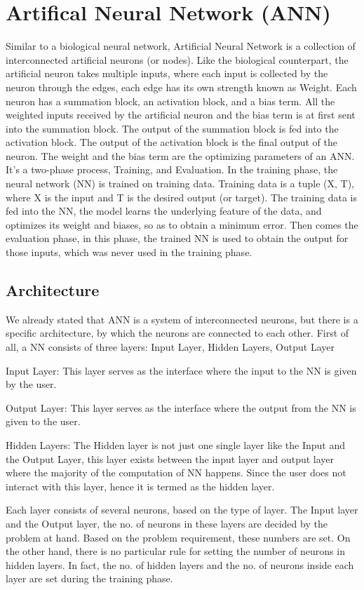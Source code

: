 \section{Artifical Neural Network (ANN)}
Similar to a biological neural network, Artificial Neural Network is a collection of interconnected artificial neurons (or nodes). Like the biological counterpart, the artificial neuron takes multiple inputs, where each input is collected by the neuron through the edges, each edge has its own strength known as Weight. Each neuron has a summation block, an activation block, and a bias term. All the weighted inputs received by the artificial neuron and the bias term is at first sent into the summation block. The output of the summation block is fed into the activation block. The output of the activation block is the final output of the neuron. The weight and the bias term are the optimizing parameters of an ANN. It's a two-phase process, Training, and Evaluation. In the training phase, the neural network (NN) is trained on training data. Training data is a tuple (X, T), where X is the input and T is the desired output (or target). The training data is fed into the NN, the model learns the underlying feature of the data, and optimizes its weight and biases, so as to obtain a minimum error. Then comes the evaluation phase, in this phase, the trained NN is used to obtain the output for those inputs, which was never used in the training phase.
\subsection{Architecture}
We already stated that ANN is a system of interconnected neurons, but there is a specific architecture, by which the neurons are connected to each other. First of all, a NN consists of three layers: Input Layer, Hidden Layers, Output Layer

Input Layer:
This layer serves as the interface where the input to the NN is given by the user.

Output Layer:
This layer serves as the interface where the output from the NN is given to the user.

Hidden Layers:
The Hidden layer is not just one single layer like the Input and the Output Layer, this layer exists between the input layer and output layer where the majority of the computation of NN happens. Since the user does not interact with this layer, hence it is termed as the hidden layer.

Each layer consists of several neurons, based on the type of layer. The Input layer and the Output layer, the no. of neurons in these layers are decided by the problem at hand. Based on the problem requirement, these numbers are set. On the other hand, there is no particular rule for setting the number of neurons in hidden layers. In fact, the no. of hidden layers and the no. of neurons inside each layer are set during the training phase. 

